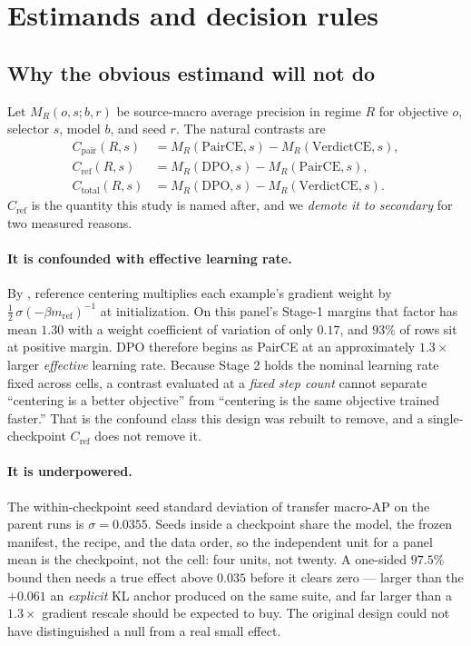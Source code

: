 \section{Estimands and decision rules}
\label{sec:estimands}

\subsection{Why the obvious estimand will not do}

Let $M_R(o,s;b,r)$ be source-macro average precision in regime $R$ for objective
$o$, selector $s$, model $b$, and seed $r$. The natural contrasts are
\begin{align}
C_{\mathrm{pair}}(R,s)&=M_R(\mathrm{PairCE},s)-M_R(\mathrm{VerdictCE},s),\\
C_{\mathrm{ref}}(R,s)&=M_R(\mathrm{DPO},s)-M_R(\mathrm{PairCE},s),\\
C_{\mathrm{total}}(R,s)&=M_R(\mathrm{DPO},s)-M_R(\mathrm{VerdictCE},s).
\end{align}
$C_{\mathrm{ref}}$ is the quantity this study is named after, and we
\emph{demote it to secondary} for two measured reasons.

\paragraph{It is confounded with effective learning rate.}
By , reference centering multiplies each example's gradient
weight by $\tfrac{1}{2}\,\sigma(-\beta m_{\mathrm{ref}})^{-1}$ at initialization.
On this panel's Stage-1 margins that factor has mean $1.30$ with a weight
coefficient of variation of only $0.17$, and $93\%$ of rows sit at positive
margin. DPO therefore begins as PairCE at an approximately $1.3\times$ larger
\emph{effective} learning rate. Because Stage 2 holds the nominal learning rate
fixed across cells, a contrast evaluated at a \emph{fixed step count} cannot
separate ``centering is a better objective'' from ``centering is the same
objective trained faster.'' That is the confound class this design was rebuilt to
remove, and a single-checkpoint $C_{\mathrm{ref}}$ does not remove it.

\paragraph{It is underpowered.}
The within-checkpoint seed standard deviation of transfer macro-AP on the parent
runs is $\sigma=0.0355$. Seeds inside a checkpoint share the model, the frozen
manifest, the recipe, and the data order, so the independent unit for a panel mean
is the checkpoint, not the cell: four units, not twenty. A one-sided $97.5\%$
bound then needs a true effect above $0.035$ before it clears zero --- larger than
the $+0.061$ an \emph{explicit} KL anchor produced on the same suite, and far
larger than a $1.3\times$ gradient rescale should be expected to buy. The original
design could not have distinguished a null from a real small effect.

